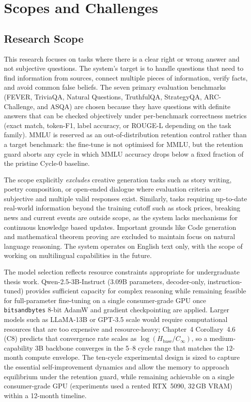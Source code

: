 \section{Scopes and Challenges}

\subsection{Research Scope}

This research focuses on tasks where there is a clear right or wrong answer and not subjective questions. The system's target is to handle questions that need to find information from sources, connect multiple pieces of information, verify facts, and avoid common false beliefs. The seven primary evaluation benchmarks (FEVER, TriviaQA, Natural Questions, TruthfulQA, StrategyQA, ARC-Challenge, and ASQA) are chosen because they have questions with definite answers that can be checked objectively under per-benchmark correctness metrics (exact match, token-F1, label accuracy, or ROUGE-L depending on the task family). MMLU is reserved as an out-of-distribution retention control rather than a target benchmark: the fine-tune is not optimised for MMLU, but the retention guard aborts any cycle in which MMLU accuracy drops below a fixed fraction of the pristine Cycle-0 baseline.

The scope explicitly \textit{excludes} creative generation tasks such as story writing, poetry composition, or open-ended dialogue where evaluation criteria are subjective and multiple valid responses exist. Similarly, tasks requiring up-to-date real-world information beyond the training cutoff such as stock prices, breaking news and current events are outside scope, as the system lacks mechanisms for continuous knowledge based updates. Important grounds like Code generation and mathematical theorem proving are excluded to maintain focus on natural language reasoning. The system operates on English text only, with the scope of working on multilingual capabilities in the future.

The model selection reflects resource constraints appropriate for undergraduate thesis work. Qwen-2.5-3B-Instruct ($3.09$B parameters, decoder-only, instruction-tuned) provides sufficient capacity for complex reasoning while remaining feasible for full-parameter fine-tuning on a single consumer-grade GPU once \texttt{bitsandbytes} 8-bit AdamW and gradient checkpointing are applied. Larger models such as LLaMA-13B or GPT-3.5 scale would require computational resources that are too expensive and resource-heavy; Chapter~4 Corollary~4.6 (C8) predicts that convergence rate scales as $\log(H_{\text{base}}/C_{\infty})$, so a medium-capability 3B backbone converges in the 5--8 cycle range that matches the $12$-month compute envelope. The ten-cycle experimental design is sized to capture the essential self-improvement dynamics and allow the memory to approach equilibrium under the retention guard, while remaining achievable on a single consumer-grade GPU (experiments used a rented RTX~5090, $32$\,GB VRAM) within a 12-month timeline.

